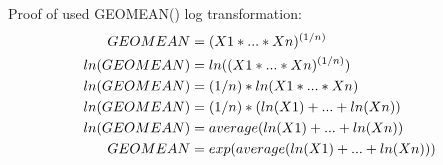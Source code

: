 \documentclass[12pt]{article}
\begin{document}
Proof of used GEOMEAN() log transformation:
\begin{equation} \label{geomean}
\begin{split}
GEOMEAN & = (X1*...*Xn)^{(1/n)} \notag \\
ln(GEOMEAN) & = ln((X1*...*Xn)^{(1/n)}) \notag \\ 
ln(GEOMEAN) & = (1/n) * ln(X1*...*Xn) \notag \\ 
ln(GEOMEAN) & = (1/n) * (ln(X1)+...+ln(Xn)) \notag \\ 
ln(GEOMEAN) & = average(ln(X1)+...+ln(Xn)) \notag \\ 
GEOMEAN & = exp(average(ln(X1)+...+ln(Xn))) \notag
\end{split}
\end{equation}

\newpage


\end{document}
